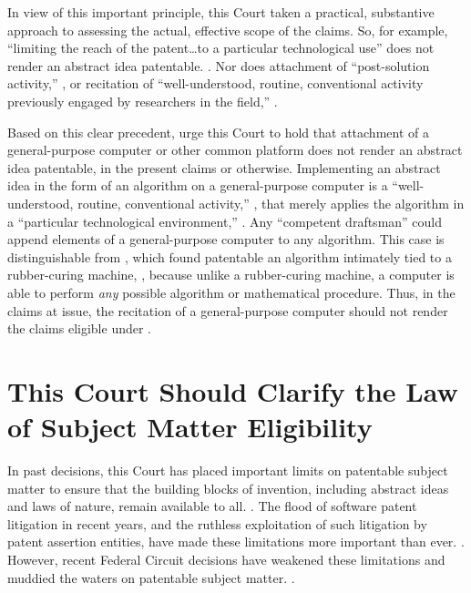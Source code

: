 \documentclass{scotus}
\begin{document}
In view of this important principle, this Court taken a practical, substantive
approach to assessing the actual,
effective scope of the claims.
So, for example,
``limiting the reach of the patent\ldots to a
particular technological use'' does not render an abstract idea patentable.
. Nor does attachment of
``post-solution activity,''
,
or
recitation of ``well-understood, routine, conventional activity previously
engaged by researchers in the field,''
.

Based on this clear precedent, \amici urge this Court to hold that
attachment of a general-purpose computer or other common platform does not
render an abstract idea
patentable, in the present claims or otherwise.
Implementing an
abstract idea in the form of an algorithm on a general-purpose computer is a
``well-understood, routine, conventional activity,'' , that
merely
applies the algorithm in a ``particular technological environment,''
.
Any ``competent draftsman'' could append elements of a
general-purpose computer to any algorithm.
This case is distinguishable from , which found patentable an
algorithm intimately tied to a rubber-curing
machine, , because unlike a rubber-curing machine, a
computer is able to perform \emph{any} possible algorithm or mathematical
procedure.
Thus, in the claims at issue, the recitation of a general-purpose computer
should not render the claims eligible under .



%
%
\section{This Court Should Clarify the Law of Subject Matter Eligibility}

In past decisions, this Court has placed important limits on patentable subject
matter to ensure that the building blocks of invention, including abstract ideas
and laws of nature, remain available to all. .  The flood
of software patent litigation in recent years, and the ruthless exploitation of
such litigation by patent assertion entities, have made these limitations more
important than ever. . However, recent Federal
Circuit decisions have weakened these limitations and muddied the waters on
patentable subject matter.  .
\end{document}
